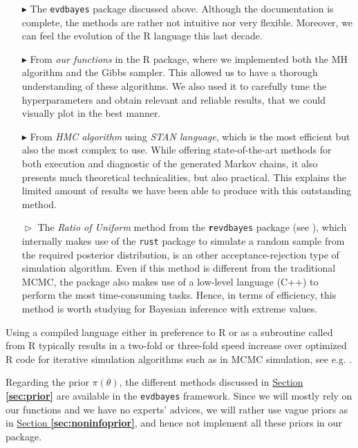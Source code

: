  \begin{itemize}
 	\item[$\blacktriangleright$] The \texttt{evdbayes} package discussed above. Although the documentation is complete, the methods are rather not intuitive nor very flexible. Moreover, we can feel the evolution of the R language this last decade.
 	
 	\item[$\blacktriangleright$] From \emph{our functions} in the R package, where we implemented both the MH algorithm and the Gibbs sampler. This allowed us to have a thorough understanding of these algorithms. We also used it to carefully tune the hyperparameters and obtain relevant and reliable results, that we could visually plot in the best manner.
 	
 	\item[$\blacktriangleright$] From \emph{HMC algorithm} using \emph{STAN language}, which is the most efficient but also the most complex to use. While offering state-of-the-art methods for both execution and diagnostic of the generated Markov chains, it also presents much theoretical technicalities, but also practical. This explains the limited amount of results we have been able to produce with this outstanding method.
 	 	
 	 \item[$\vartriangleright$] The \emph{Ratio of Uniform} method from the \texttt{\textbf{r}evdbayes} package (see \citet{northrop_2017_revd}), which internally makes use of the \texttt{rust} package to simulate a random sample from the required posterior distribution,  is an other acceptance-rejection type of simulation algorithm.
   Even if this method is different from the traditional MCMC, the package also makes use of a low-level language (C++) to perform the most time-consuming tasks. Hence, in terms of efficiency, this method is worth studying for Bayesian inference with extreme values.   
 \end{itemize}
 Using a compiled language either in preference to R or as a subroutine called from R typically results in a two-fold or three-fold
 speed increase over optimized R code for iterative simulation algorithms such as in MCMC simulation, see e.g. \citet{stan_development_team_stan_2012}.

Regarding the prior $\pi(\theta)$, the different methods discussed in \hyperref[sec:prior]{Section \textbf{\ref{sec:prior}}} are available in the \texttt{evdbayes} framework. Since we will mostly rely on our functions and we have no experts' advices, we will rather use vague priors as in \hyperref[sec:noninfoprior]{Section \textbf{\ref{sec:noninfoprior}}}, and hence not implement all these priors in our package. 

